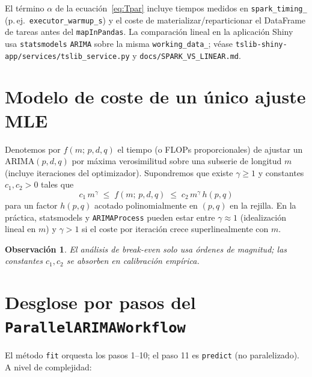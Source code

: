 \documentclass[11pt,a4paper]{article}
\newtheorem{remark}{Observación}
\begin{document}
El término $\alpha$ de la ecuación~\eqref{eq:Tpar} incluye tiempos medidos en
\texttt{spark\_timing\_} (p.\,ej.\ \texttt{executor\_warmup\_s}) y el coste de
materializar/reparticionar el DataFrame de tareas antes del \texttt{mapInPandas}.
La comparación lineal en la aplicación Shiny usa \texttt{statsmodels}
\texttt{ARIMA} sobre la misma \texttt{working\_data\_}; véase
\texttt{tslib-shiny-app/services/tslib\_service.py} y
\texttt{docs/SPARK\_VS\_LINEAR.md}.

\section{Modelo de coste de un único ajuste MLE}

Denotemos por $f(m;\,p,d,q)$ el tiempo (o FLOPs proporcionales) de ajustar un
ARIMA$(p,d,q)$ por máxima verosimilitud sobre una subserie de longitud $m$
(incluye iteraciones del optimizador). Supondremos que existe $\gamma \ge 1$ y
constantes $c_1,c_2>0$ tales que
\begin{equation}
  \label{eq:fgrowth}
  c_1\, m^{\gamma} \;\le\; f(m;\,p,d,q) \;\le\; c_2\, m^{\gamma}\, h(p,q)
\end{equation}
para un factor $h(p,q)$ acotado polinomialmente en $(p,q)$ en la rejilla. En la
práctica, statsmodels y \texttt{ARIMAProcess} pueden estar entre $\gamma\approx 1$
(idealización lineal en $m$) y $\gamma>1$ si el coste por iteración crece
superlinealmente con $m$.

\begin{remark}
  El análisis de \emph{break-even} solo usa órdenes de magnitud; las constantes
  $c_1,c_2$ se absorben en calibración empírica.
\end{remark}

\section{Desglose por pasos del \texttt{ParallelARIMAWorkflow}}

El método \texttt{fit} orquesta los pasos 1--10; el paso 11 es \texttt{predict}
(no paralelizado). A nivel de complejidad:
\end{document}
